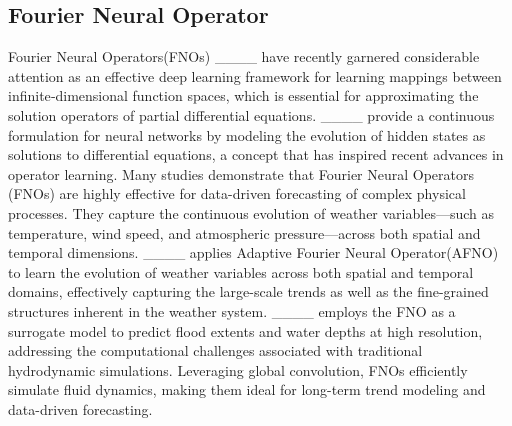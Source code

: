 \subsection{Fourier Neural Operator}
Fourier Neural Operators(FNOs) ____ have recently garnered considerable attention as an effective deep learning framework for learning mappings between infinite‐dimensional function spaces, which is essential for approximating the solution operators of partial differential equations.
____ provide a continuous formulation for neural networks by modeling the evolution of hidden states as solutions to differential equations, a concept that has inspired recent advances in operator learning.
Many studies demonstrate that Fourier Neural Operators (FNOs) are highly effective for data-driven forecasting of complex physical processes. They capture the continuous evolution of weather variables—such as temperature, wind speed, and atmospheric pressure—across both spatial and temporal dimensions. ____ applies Adaptive Fourier Neural Operator(AFNO) to learn the evolution of weather variables across both spatial and temporal domains, effectively capturing the large-scale trends as well as the fine-grained structures inherent in the weather system.
____ employs the FNO as a surrogate model to predict flood extents and water depths at high resolution, addressing the computational challenges associated with traditional hydrodynamic simulations. Leveraging global convolution, FNOs efficiently simulate fluid dynamics, making them ideal for long-term trend modeling and data-driven forecasting.


